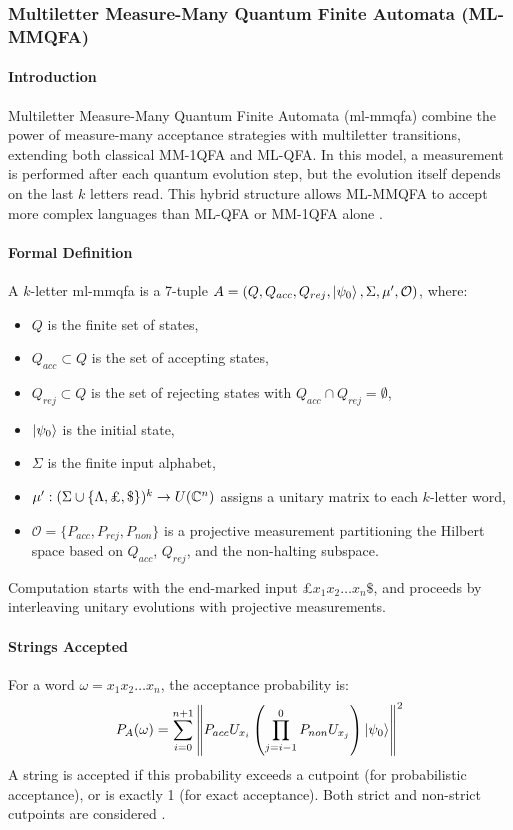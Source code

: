 \subsubsection{Multiletter Measure-Many Quantum Finite Automata (ML-MMQFA)}

\paragraph{Introduction}
Multiletter Measure-Many Quantum Finite Automata (\gls{ml-mmqfa}) combine the power of measure-many acceptance strategies with multiletter transitions, extending both classical MM-1QFA and ML-QFA. In this model, a measurement is performed after each quantum evolution step, but the evolution itself depends on the last $k$ letters read. This hybrid structure allows ML-MMQFA to accept more complex languages than ML-QFA or MM-1QFA alone \cite{lin2012equivalence}.

\paragraph{Formal Definition}
A $k$-letter \gls{ml-mmqfa} is a 7-tuple $A = (Q, Q_{acc}, Q_{rej}, \ket{\psi_0}, \Sigma, \mu', \mathcal{O})$, where:
\begin{itemize}
    \item $Q$ is the finite set of states,
    \item $Q_{acc} \subset Q$ is the set of accepting states,
    \item $Q_{rej} \subset Q$ is the set of rejecting states with $Q_{acc} \cap Q_{rej} = \emptyset$,
    \item $\ket{\psi_0}$ is the initial state,
    \item $\Sigma$ is the finite input alphabet,
    \item $\mu': (\Sigma \cup \{\Lambda, \text{\textsterling}, \$\})^k \to U(\mathbb{C}^n)$ assigns a unitary matrix to each $k$-letter word,
    \item $\mathcal{O} = \{P_{acc}, P_{rej}, P_{non}\}$ is a projective measurement partitioning the Hilbert space based on $Q_{acc}$, $Q_{rej}$, and the non-halting subspace.
\end{itemize}
Computation starts with the end-marked input £$x_1x_2 \dots x_n\$$, and proceeds by interleaving unitary evolutions with projective measurements.

\paragraph{Strings Accepted}
For a word $\omega = x_1 x_2 \dots x_n$, the acceptance probability is:
\[
P_A(\omega) = \sum_{i=0}^{n+1} \left\| P_{acc} U_{x_i} \left( \prod_{j=i-1}^{0} P_{non} U_{x_j} \right) \ket{\psi_0} \right\|^2
\]
A string is accepted if this probability exceeds a cutpoint (for probabilistic acceptance), or is exactly 1 (for exact acceptance). Both strict and non-strict cutpoints are considered \cite{lin2012equivalence}.

